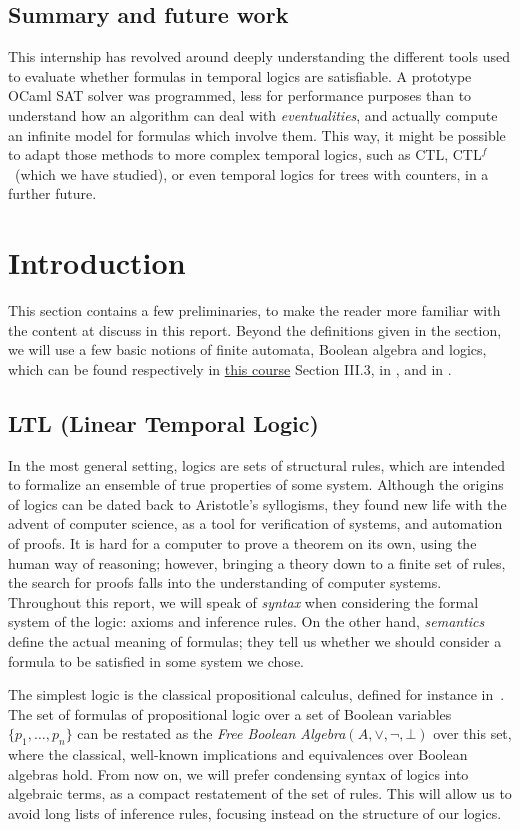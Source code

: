 \documentclass[11pt]{article}
\newcommand{\CTLf}{{CTL$^f$}}
\newcommand{\orr}{{\vee}}
\theoremstyle{definition}
\begin{document}
\subsection*{Summary and future work}
This internship has revolved around deeply understanding the different tools used to evaluate whether formulas in 
temporal logics are satisfiable. A prototype OCaml SAT solver was programmed, less for performance purposes than to understand 
how an algorithm can deal with \emph{eventualities}, and actually compute an infinite model for formulas which involve them.
This way, it might be possible to adapt those methods to more complex temporal logics, such as CTL, \CTLf~(which we have studied),
or even temporal logics for trees with counters, in a further future.
\newpage  

\section{Introduction}\label{SecIntro}
This section contains a few preliminaries, to make the reader more familiar with the
content at discuss in this report. Beyond the definitions given in the section, we
will use
a few basic notions of finite automata, Boolean algebra and logics,
which can be found respectively in \href{https://www.irif.fr/~jep/PDF/MPRI/MPRI.pdf}{this course} Section III.3,
in \cite[Section 1.2]{GehvG22}, and in \cite[Section 3]{PropLog}.

\subsection{LTL (Linear Temporal Logic)}
In the most general setting, logics are sets of structural rules, which are intended to
formalize an ensemble of true properties of some system. Although the origins of logics can 
be dated back to Aristotle's syllogisms, they found new life with the advent of computer 
science, as a tool for verification of systems, and automation of proofs. It is hard
for a computer to prove a theorem on its own, using the human way of reasoning; however,
bringing a theory down to a finite set of rules, the search for proofs falls into the 
understanding of computer systems. Throughout this report, we will speak of \emph{syntax} when
considering the formal system of the logic: axioms and inference rules. On the other hand,
\emph{semantics} define the actual meaning of formulas; they tell us whether we should consider a
formula to be satisfied in some system we chose.

The simplest logic is the classical propositional calculus, defined for instance in~\cite[Section 3]{PropLog}. 
The set of formulas of propositional logic over a set of Boolean variables 
$\{p_1,\ldots,p_n\}$ can be restated as the \emph{Free Boolean Algebra}\cite[Section 4.1]{GehvG22}$(A,\orr,\neg,\bot)$
over this set,
where the classical, well-known implications and equivalences over Boolean algebras hold. From now
on, we will prefer condensing syntax of logics into algebraic terms, as a compact restatement of the set of rules.
This will allow us to avoid long lists of inference rules, focusing instead on the
structure of our logics.
\end{document}
